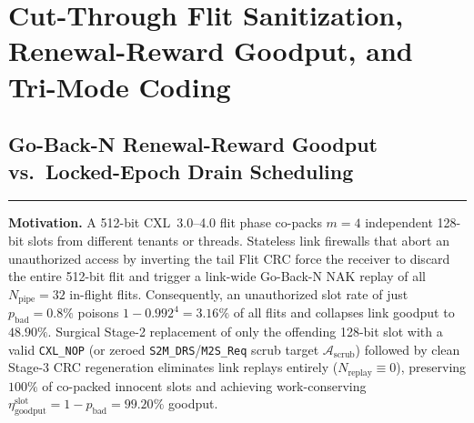 \documentclass[10pt,twocolumn]{article}
\makeatletter
\newif\ifspecintwocol \specintwocolfalse
\newif\ifspecresume   \specresumefalse
\newcommand{\StopTwoCol}{%
  \if@twocolumn
    \onecolumn
    \global\specintwocolfalse
    \let\spec@next\@empty
  \else
    \ifspecintwocol
      \global\specintwocolfalse
      \def\spec@next{\end{multicols}}%
    \else
      \let\spec@next\@empty
    \fi
  \fi
  \spec@next
}
\newcommand{\BeginConnesPlate}{%
  \if@twocolumn
    \onecolumn
    \global\specresumetrue
    \let\spec@platepre\@empty
  \else
    \ifspecintwocol
      \global\specresumetrue
      \let\spec@platepre\StopTwoCol
    \else
      \global\specresumefalse
      \let\spec@platepre\@empty
    \fi
  \fi
  \spec@platepre
  \par\vspace{4pt}\noindent\textcolor{black!25}{\rule{\textwidth}{0.4pt}}\par\vspace{3pt}%
}
\theoremstyle{spectralthm}
\makeatother
\begin{document}
\section{Cut-Through Flit Sanitization, Renewal-Reward Goodput, and Tri-Mode Coding}
\label{sec:pipeline}

\subsection{Go-Back-N Renewal-Reward Goodput vs.\ Locked-Epoch Drain Scheduling}
\BeginConnesPlate
\noindent\textbf{Motivation.}\; A 512-bit CXL~3.0--4.0 flit phase co-packs $m=4$ independent 128-bit slots from different tenants or threads. Stateless link firewalls that abort an unauthorized access by inverting the tail Flit CRC force the receiver to discard the entire 512-bit flit and trigger a link-wide Go-Back-N NAK replay of all $N_{\mathrm{pipe}} = 32$ in-flight flits. Consequently, an unauthorized slot rate of just $p_{\mathrm{bad}} = 0.8\%$ poisons $1 - 0.992^4 = 3.16\%$ of all flits and collapses link goodput to $48.90\%$. Surgical Stage-2 replacement of only the offending 128-bit slot with a valid \texttt{CXL\_NOP} (or zeroed \texttt{S2M\_DRS}/\texttt{M2S\_Req} scrub target $\mathcal{A}_{\mathrm{scrub}}$) followed by clean Stage-3 CRC regeneration eliminates link replays entirely ($N_{\mathrm{replay}} \equiv 0$), preserving $100\%$ of co-packed innocent slots and achieving work-conserving $\eta_{\mathrm{goodput}}^{\mathrm{slot}} = 1 - p_{\mathrm{bad}} = 99.20\%$ goodput.
\end{document}
